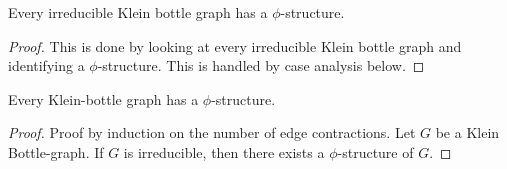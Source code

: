 \begin{lemma}
    Every irreducible Klein bottle graph has a $\phi$-structure. 
\end{lemma}

\begin{proof}
    This is done by looking at every irreducible Klein bottle graph and identifying a $\phi$-structure. This is handled by case analysis below.
\end{proof}

\begin{lemma}
    Every Klein-bottle graph has a $\phi$-structure. 
\end{lemma}

\begin{proof}
    Proof by induction on the number of edge contractions. Let $G$ be a Klein Bottle-graph. If $G$ is irreducible, then there exists a $\phi$-structure of $G$. 
\end{proof}